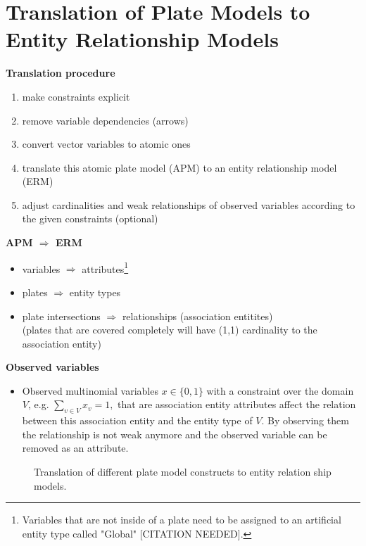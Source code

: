 \section{Translation of Plate Models to Entity Relationship Models}

\textbf{Translation procedure}
\begin{enumerate}
\item make constraints explicit
\item remove variable dependencies (arrows)
\item convert vector variables to atomic ones
\item translate this atomic plate model (APM) to an entity relationship model (ERM)
\item adjust cardinalities and weak relationships of observed variables according to the given constraints (optional)
\end{enumerate}

\textbf{APM $\Rightarrow$ ERM}
\begin{itemize}
\item variables $\Rightarrow$ attributes\footnote{Variables that are not inside of a plate need to be assigned to an artificial entity type called "Global" [CITATION NEEDED].}
\item plates $\Rightarrow$ entity types
\item plate intersections $\Rightarrow$ relationships (association entitites)\\
	(plates that are covered completely will have (1,1) cardinality to the association entity)
\end{itemize}

\textbf{Observed variables}
\begin{itemize}
\item Observed multinomial variables $x \in \{0,1\}$ with a constraint over the domain $V$, e.g. $\sum_{v \in V} x_v = 1,$ that are association entity attributes affect the relation between this association entity and the entity type of $V$. By observing them the relationship is not weak anymore and the observed variable can be removed as an attribute.
\end{itemize}

\begin{figure}
\resizebox{1\linewidth}{!}{}
\caption{Translation of different plate model constructs to entity relation ship models.}\label{fig:ml-application-architecture}
\end{figure}
